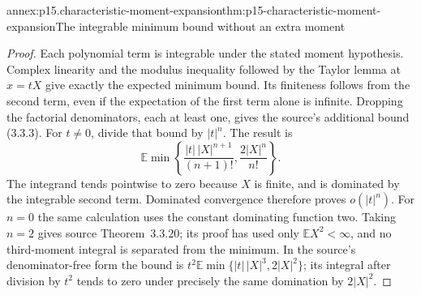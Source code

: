 \begin{annexitem}{annex:p15.characteristic-moment-expansion}{thm:p15-characteristic-moment-expansion}{The integrable minimum bound without an extra moment}
\begin{proof}
Each polynomial term is integrable under the
stated moment hypothesis. Complex linearity and
the modulus inequality followed by the Taylor
lemma at \(x=tX\) give exactly the expected
minimum bound. Its finiteness follows from the
second term, even if the expectation of the
first term alone is infinite.
Dropping the factorial denominators, each at least
one, gives the source's additional bound (3.3.3).
For \(t\ne0\), divide that bound by \(|t|^n\).
The result is
\[
 \mathbb E\min\left\{
       \frac{|t|\,|X|^{n+1}}{(n+1)!},
                         \frac{2|X|^n}{n!}\right\}.
\]
The integrand tends pointwise to zero because
\(X\) is finite, and is dominated by the
integrable second term. Dominated convergence
therefore proves \(o(|t|^n)\).
For \(n=0\) the same calculation uses the
constant dominating function two.
Taking \(n=2\) gives source Theorem~3.3.20;
its proof has used only \(\mathbb EX^2<\infty\),
and no third-moment integral is separated from
the minimum.
In the source's denominator-free form the bound is
\(t^2\mathbb E\min\{|t|\,|X|^3,2|X|^2\}\);
its integral after division by \(t^2\) tends to
zero under precisely the same domination by \(2|X|^2\).
\end{proof}
\end{annexitem}

